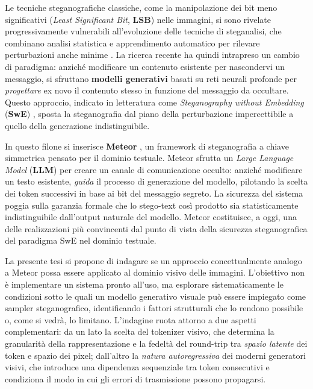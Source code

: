 Le tecniche steganografiche classiche, come la manipolazione dei bit meno significativi (\emph{Least Significant Bit}, \textbf{LSB}) nelle immagini, si sono rivelate progressivamente vulnerabili all'evoluzione delle tecniche di steganalisi, che combinano analisi statistica e apprendimento automatico per rilevare perturbazioni anche minime \cite{apau-2024, subramanian-2021}. La ricerca recente ha quindi intrapreso un cambio di paradigma: anziché modificare un contenuto esistente per nascondervi un messaggio, si sfruttano \textbf{modelli generativi} basati su reti neurali profonde per \emph{progettare} ex novo il contenuto stesso in funzione del messaggio da occultare. Questo approccio, indicato in letteratura come \emph{Steganography without Embedding} (\textbf{SwE}) \cite{liu-2020, dong-2025}, sposta la steganografia dal piano della perturbazione impercettibile a quello della generazione indistinguibile.

In questo filone si inserisce \textbf{Meteor} \cite{kaptchuk-2021}, un framework di steganografia a chiave simmetrica pensato per il dominio testuale. Meteor sfrutta un \emph{Large Language Model} (\textbf{LLM}) per creare un canale di comunicazione occulto: anziché modificare un testo esistente, \emph{guida} il processo di generazione del modello, pilotando la scelta dei token successivi in base ai bit del messaggio segreto. La sicurezza del sistema poggia sulla garanzia formale che lo stego-text così prodotto sia statisticamente indistinguibile dall'output naturale del modello. Meteor costituisce, a oggi, una delle realizzazioni più convincenti dal punto di vista della sicurezza steganografica  del paradigma SwE nel dominio testuale.

La presente tesi si propone di indagare se un approccio concettualmente analogo a Meteor possa essere applicato al dominio visivo delle immagini. L'obiettivo non è implementare un sistema pronto all'uso, ma esplorare sistematicamente le condizioni sotto le quali un modello generativo visuale può essere impiegato come sampler steganografico, identificando i fattori strutturali che lo rendono possibile o, come si vedrà, lo limitano. L'indagine ruota attorno a due aspetti complementari: da un lato la scelta del tokenizer visivo, che determina la granularità della rappresentazione e la fedeltà del round-trip tra \emph{spazio latente} dei token e spazio dei pixel; dall'altro la \emph{natura autoregressiva} dei moderni generatori visivi, che introduce una dipendenza sequenziale tra token consecutivi e condiziona il modo in cui gli errori di trasmissione possono propagarsi.


